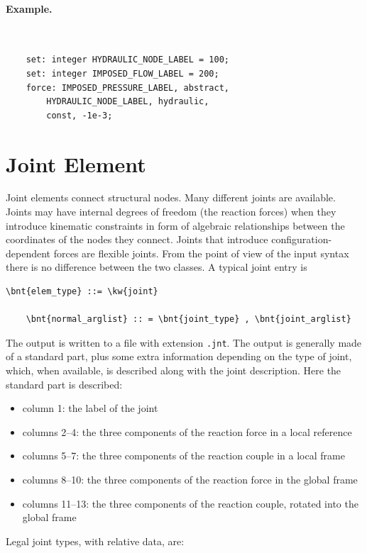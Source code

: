 \paragraph{Example.} \
\begin{verbatim}
    set: integer HYDRAULIC_NODE_LABEL = 100;
    set: integer IMPOSED_FLOW_LABEL = 200;
    force: IMPOSED_PRESSURE_LABEL, abstract,
        HYDRAULIC_NODE_LABEL, hydraulic,
        const, -1e-3;
\end{verbatim}





\section{Joint Element}
Joint elements connect structural nodes.
Many different joints are available. 
Joints may have internal degrees of freedom (the reaction forces)
when they introduce kinematic constraints in form of algebraic relationships
between the coordinates of the nodes they connect.
Joints that introduce configuration-dependent forces are flexible joints.
From the point of view of the input syntax there is no difference between
the two classes.
A typical joint entry is
\begin{Verbatim}[commandchars=\\\{\}]
    \bnt{elem_type} ::= \kw{joint}

    \bnt{normal_arglist} :: = \bnt{joint_type} , \bnt{joint_arglist}
\end{Verbatim}
The output is written to a file with extension \texttt{.jnt}.
The output is generally made of a standard part, plus some extra information
depending on the type of joint, which, when available, is described along
with the joint description.
Here the standard part is described:
\begin{itemize}
    \item column 1: the label of the joint
    \item columns 2--4: the three components of the reaction force in a local reference
    \item columns 5--7: the three components of the reaction couple in a local frame
    \item columns 8--10: the three components of the reaction force in the global frame
    \item columns 11--13: the three components of the reaction couple, rotated into the
          global frame
\end{itemize}
Legal joint types, with relative data, are:




